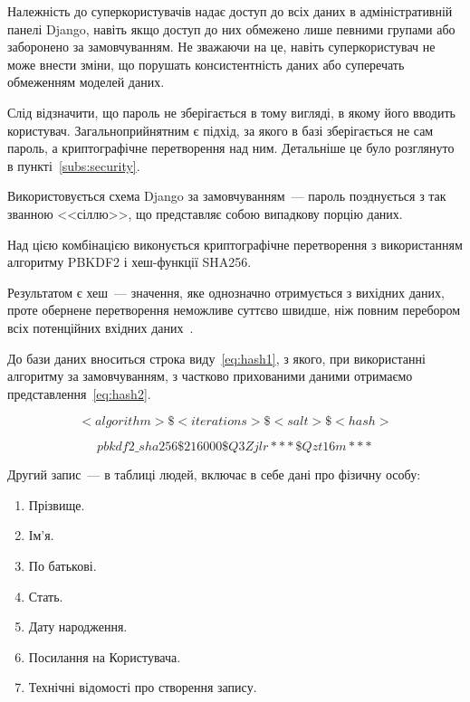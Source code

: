 Належність до суперкористувачів надає доступ до всіх даних в адміністративній панелі Django, навіть якщо доступ до них обмежено лише певними групами або заборонено за замовчуванням. Не зважаючи на це, навіть суперкористувач не може внести зміни, що порушать консистентність даних або суперечать обмеженням моделей даних.

Слід відзначити, що пароль не зберігається в тому вигляді, в якому його вводить користувач. Загальноприйнятним є підхід, за якого в базі зберігається не сам пароль, а криптографічне перетворення над ним. Детальніше це було розглянуто в пункті~\ref{subs:security}. 

Використовується схема Django за замовчуванням~--- пароль поэднується з так званною <<сіллю>>, що представляє собою випадкову порцію даних. 

Над цією комбінацією виконується криптографічне перетворення з використанням алгоритму PBKDF2 і хеш-функції SHA256. 

Результатом є хеш~--- значення, яке однозначно отримується з вихідних даних, проте обернене перетворення неможливе суттєво швидше, ніж повним перебором всіх потенційних вхідних даних~\cite{carter1979universal}.

До бази даних вноситься строка виду~\ref{eq:hash1}, з якого, при використанні алгоритму за замовчуванням, з частково прихованими даними отримаємо представлення~\ref{eq:hash2}.

\begin{equation} <algorithm>\$<iterations>\$<salt>\$<hash> \label{eq:hash1}\end{equation}

\begin{equation} pbkdf2\_sha256\$216000\$Q3Zjlr***\$Qzt16m*** \label{eq:hash2}\end{equation}

Другий запис~--- в таблиці людей, включає в себе дані про фізичну особу:
\begin{enumerate}[label={\arabic*.}]
    \item Прізвище.
    \item Ім'я.
    \item По батькові.
    \item Стать.
    \item Дату народження.
    \item Посилання на Користувача.
    \item Технічні відомості про створення запису.
\end{enumerate}


